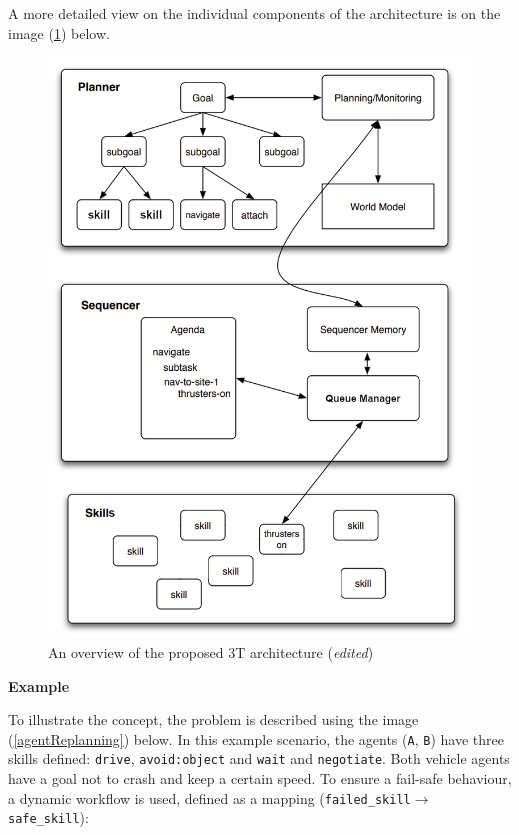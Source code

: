 \documentclass[main.tex]{subfiles}
\begin{document}
A more detailed view on the individual components of the architecture is on the image (\ref{3t-arch-detailed}) below.

\begin{figure}[htbp]
    \centering
    \includegraphics[width=.8\textwidth]{3T-arch-edited.png}
    \caption{An overview of the proposed 3T architecture \cite{Binder2022} (\emph{edited})}
    \label{3t-arch-detailed}
\end{figure}
\pagebreak

\textbf{Example}

To illustrate the concept, the problem is described using the image (\ref{agentReplanning})
below. In this example scenario, the agents (\texttt{A}, \texttt{B}) have three skills defined:
\texttt{drive}, \texttt{avoid:object} and \texttt{wait} and \texttt{negotiate}. Both vehicle agents have a goal not
to crash and keep a certain speed. To ensure a fail-safe behaviour, a dynamic workflow is used, 
defined as a mapping (\texttt{failed\_skill}$\rightarrow$\texttt{safe\_skill}): 
\end{document}
